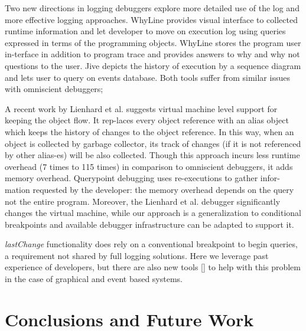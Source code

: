 \documentclass[preprint]{sigplanconf}
\begin{document}
Two new directions in logging debuggers explore more detailed use of
the log and more effective logging approaches. WhyLine\cite{Ko}
provides visual interface to collected runtime information and let
developer to move on execution log using queries expressed in terms of
the programming objects. WhyLine stores the program user in-terface in
addition to program trace and provides answers to why and why not
questions to the user. Jive\cite{Czyz} depicts the history of
execution by a sequence diagram and lets user to query on events
database. Both tools suffer from similar issues with omniscient
debuggers;

A recent work by Lienhard et al.\cite{Lienhard} suggests virtual
machine level support for keeping the object flow. It rep-laces every
object reference with an alias object which keeps the history of
changes to the object reference. In this way, when an object is
collected by garbage collector, its track of changes (if it is not
referenced by other alias-es) will be also collected. Though this
approach incurs less runtime overhead (7 times to 115 times) in
comparison to omniscient debuggers, it adds memory
overhead. Querypoint debugging uses re-executions to gather
infor-mation requested by the developer: the memory overhead depends
on the query not the entire program. Moreover, the Lienhard et
al. debugger significantly changes the virtual machine, while our
approach is a generalization to conditional breakpoints and available
debugger infrastructure can be adapted to support it.
 
\textit{lastChange} functionality does rely on a conventional
breakpoint to begin queries, a requirement not shared by full logging
solutions.  Here we leverage past experience of developers, but there
are also new tools [] to help with this problem in the case of
graphical and event based systems.


\section{Conclusions and Future Work}






\end{document}

